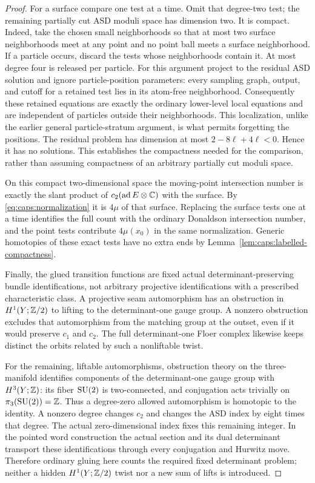 \begin{proof}
For a surface compare one test at a time.  Omit that degree-two test;
the remaining partially cut ASD moduli space has dimension two.
It is compact.  Indeed, take the chosen small neighborhoods so that
at most two surface neighborhoods meet at any point and no point ball
meets a surface neighborhood.  If a particle occurs, discard the tests
whose neighborhoods contain it.  At most degree four is released per
particle.  For this argument project to the residual ASD solution and
ignore particle-position parameters: every sampling graph, output,
and cutoff for a retained test lies in its atom-free neighborhood.
Consequently these retained equations are exactly the ordinary
lower-level local equations and are independent of particles outside
their neighborhoods.  This localization, unlike the earlier general
particle-stratum argument, is what permits forgetting the positions.
The residual problem has dimension at most
$2-8\ell+4\ell<0$.  Hence it has no solutions.  This establishes the
compactness needed for the comparison, rather than assuming compactness
of an arbitrary partially cut moduli space.

On this compact two-dimensional space the moving-point intersection
number is exactly the slant product of $c_2(\operatorname{ad} E\otimes\mathbb C)$ with
the surface.  By \eqref{eq:caps:normalization} it is $4\mu$ of that
surface.  Replacing the surface tests one at a time identifies the full
count with the ordinary Donaldson intersection number, and the point
tests contribute $4\mu(x_0)$ in the same normalization.  Generic
homotopies of these exact tests have no extra ends by
Lemma~\ref{lem:caps:labelled-compactness}.

Finally, the glued transition functions are fixed actual
determinant-preserving bundle identifications, not arbitrary projective
identifications with a prescribed characteristic class.  A projective
seam automorphism has an obstruction in $H^1(Y;\mathbb Z/2)$ to lifting to
the determinant-one gauge group.  A nonzero obstruction excludes that
automorphism from the matching group at the outset, even if it would
preserve $c_1$ and $c_2$.  The full determinant-one Floer complex likewise
keeps distinct the orbits related by such a nonliftable twist.

For the remaining, liftable automorphisms, obstruction theory on the
three-manifold identifies components of the determinant-one gauge group
with $H^3(Y;\mathbb Z)$: its fiber $\operatorname{SU}(2)$ is two-connected, and conjugation
acts trivially on $\pi_3(\operatorname{SU}(2))=\mathbb Z$.  Thus a degree-zero allowed
automorphism is homotopic to the identity.  A nonzero degree changes
$c_2$ and changes the ASD index by eight times that degree.  The actual
zero-dimensional index fixes this remaining integer.  In the pointed
word construction the actual section and its dual determinant transport
these identifications through every conjugation and Hurwitz move.
Therefore ordinary gluing here counts the required fixed determinant
problem; neither a hidden $H^1(Y;\mathbb Z/2)$ twist nor a new sum of lifts is
introduced.


\end{proof}
